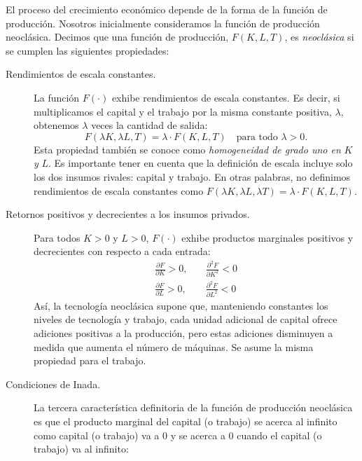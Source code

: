 El proceso del crecimiento económico depende de la forma de la función de producción. Nosotros inicialmente consideramos la función de producción neoclásica. Decimos que una función de producción, $F\left(K,L,T\right)$, es \emph{neoclásica} si se cumplen las siguientes propiedades:
\begin{description}
	\item[Rendimientos de escala constantes.] La función $F\left(\cdot\right)$ exhibe rendimientos de escala constantes. Es decir, si multiplicamos el capital y el trabajo por la misma constante positiva, $\lambda$, obtenemos $\lambda$ veces la cantidad de salida:
	\begin{equation}
	F\left(\lambda K,\lambda L,T\right)=\lambda\cdot F\left(K,L,T\right)\quad\text{para todo }\lambda>0.
	\end{equation}
	Esta propiedad también se conoce como \emph{homogeneidad de grado uno en} $K$ \emph{y} $L$. Es importante tener en cuenta que la definición de escala incluye solo los dos insumos rivales: capital y trabajo. En otras palabras, no definimos rendimientos de escala constantes como $F\left(\lambda K,\lambda L,\lambda T\right)=\lambda\cdot F\left(K,L,T\right)$.
	\item[Retornos positivos y decrecientes a los insumos privados.] Para todos $K>0$ y $L>0$, $F\left(\cdot\right)$ exhibe productos marginales positivos y decrecientes con respecto a cada entrada:
	\begin{equation}
	\begin{split}
	\frac{\partial F}{\partial K}>0,\quad&\frac{\partial^{2}F}{\partial K^{2}}<0\\
	\frac{\partial F}{\partial L}>0,\quad&\frac{\partial^{2}F}{\partial L^{2}}<0
	\end{split}
	\end{equation}
Así, la tecnología neoclásica supone que, manteniendo constantes los niveles de tecnología y trabajo, cada unidad adicional de capital ofrece adiciones positivas a la producción, pero estas adiciones disminuyen a medida que aumenta el número de máquinas. Se asume la misma propiedad para el trabajo.
\item[Condiciones de Inada.] La tercera característica definitoria de la función de producción neoclásica es que el producto marginal del capital (o trabajo) se acerca al infinito como capital (o trabajo) va a $0$ y se acerca a $0$ cuando el capital (o trabajo) va al infinito:
\begin{equation}
\begin{split}

\end{split}
\end{equation}
\end{description}
